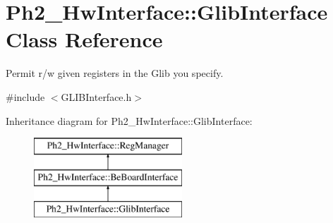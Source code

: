 \hypertarget{class_ph2___hw_interface_1_1_glib_interface}{\section{Ph2\-\_\-\-Hw\-Interface\-:\-:Glib\-Interface Class Reference}
\label{class_ph2___hw_interface_1_1_glib_interface}
}


Permit r/w given registers in the Glib you specify.  




{\ttfamily \#include $<$G\-L\-I\-B\-Interface.\-h$>$}

Inheritance diagram for Ph2\-\_\-\-Hw\-Interface\-:\-:Glib\-Interface\-:\begin{figure}[H]
\begin{center}
\leavevmode
\includegraphics[height=3.000000cm]{class_ph2___hw_interface_1_1_glib_interface}
\end{center}
\end{figure}
